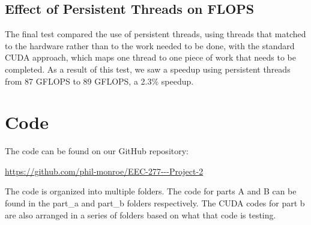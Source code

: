 \documentclass[12pt] {article}
\begin{document}
\subsection{Effect of Persistent Threads on FLOPS}
The final test compared the use of persistent threads, using threads that matched to the hardware rather than to the work needed to be done, with the standard CUDA approach, which maps one thread to one piece of work that needs to be completed. As a result of this test, we saw a speedup using persistent threads from 87 GFLOPS to 89 GFLOPS, a 2.3\% speedup.

\clearpage
\section{Code}
\begin{center}
	The code can be found on our GitHub repository:

	\url {https://github.com/phil-monroe/EEC-277---Project-2}
\end{center}

The code is organized into multiple folders. The code for parts A and B can be found in the part\_a and part\_b folders respectively. The CUDA codes for part b are also arranged in a series of folders based on what that code is testing.
\end{document}

